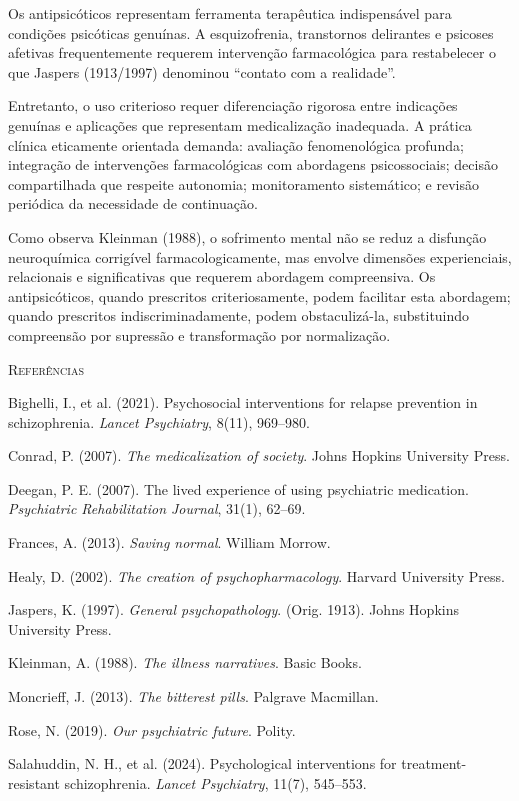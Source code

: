 Os antipsicóticos representam ferramenta terapêutica indispensável para condições psicóticas genuínas. A esquizofrenia, transtornos delirantes e psicoses afetivas frequentemente requerem intervenção farmacológica para restabelecer o que Jaspers (1913/1997) denominou \enquote{contato com a realidade}.

Entretanto, o uso criterioso requer diferenciação rigorosa entre indicações genuínas e aplicações que representam medicalização inadequada. A prática clínica eticamente orientada demanda: avaliação fenomenológica profunda; integração de intervenções farmacológicas com abordagens psicossociais; decisão compartilhada que respeite autonomia; monitoramento sistemático; e revisão periódica da necessidade de continuação.

Como observa Kleinman (1988), o sofrimento mental não se reduz a disfunção neuroquímica corrigível farmacologicamente, mas envolve dimensões experienciais, relacionais e significativas que requerem abordagem compreensiva. Os antipsicóticos, quando prescritos criteriosamente, podem facilitar esta abordagem; quando prescritos indiscriminadamente, podem obstaculizá-la, substituindo compreensão por supressão e transformação por normalização.

\vspace{2em}
\begin{small}
\noindent\textsc{Referências}

\vspace{1em}
\noindent Bighelli, I., et al. (2021). Psychosocial interventions for relapse prevention in schizophrenia. \textit{Lancet Psychiatry}, 8(11), 969--980.

\noindent Conrad, P. (2007). \textit{The medicalization of society}. Johns Hopkins University Press.

\noindent Deegan, P. E. (2007). The lived experience of using psychiatric medication. \textit{Psychiatric Rehabilitation Journal}, 31(1), 62--69.

\noindent Frances, A. (2013). \textit{Saving normal}. William Morrow.

\noindent Healy, D. (2002). \textit{The creation of psychopharmacology}. Harvard University Press.

\noindent Jaspers, K. (1997). \textit{General psychopathology}. (Orig. 1913). Johns Hopkins University Press.

\noindent Kleinman, A. (1988). \textit{The illness narratives}. Basic Books.

\noindent Moncrieff, J. (2013). \textit{The bitterest pills}. Palgrave Macmillan.

\noindent Rose, N. (2019). \textit{Our psychiatric future}. Polity.

\noindent Salahuddin, N. H., et al. (2024). Psychological interventions for treatment-resistant schizophrenia. \textit{Lancet Psychiatry}, 11(7), 545--553.
\end{small}
